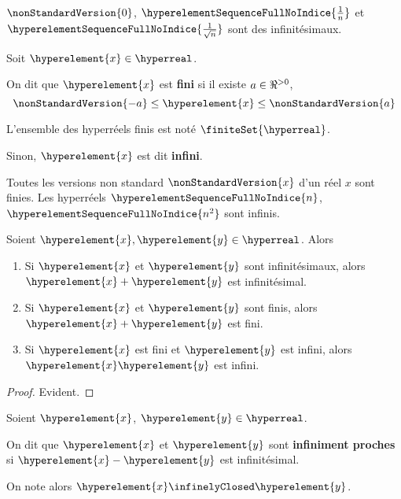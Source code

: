 \begin{exemple}
	$\nonStandardVersion{0}$, $\hyperelementSequenceFullNoIndice{\frac{1}{n}}$ et
	$\hyperelementSequenceFullNoIndice{\frac{1}{\sqrt{n}}}$ sont des infinitésimaux.
\end{exemple}

\begin{definition} 
	Soit $\hyperelement{x} \in \hyperreal$.

	On dit que $\hyperelement{x}$ est \textbf{fini} si il existe $a \in \real^{> 0}$,
	\begin{equation}
		\nonStandardVersion{-a} \leq \hyperelement{x} \leq \nonStandardVersion{a}
	\end{equation}

	L'ensemble des hyperréels finis est noté $\finiteSet{\hyperreal}$.

	Sinon, $\hyperelement{x}$ est dit \textbf{infini}.
\end{definition}

\begin{exemple}
	Toutes les versions non standard $\nonStandardVersion{x}$ d'un réel $x$ sont
	finies. Les hyperréels $\hyperelementSequenceFullNoIndice{n}$,
	$\hyperelementSequenceFullNoIndice{n^{2}}$ sont infinis.
\end{exemple}

\begin{proposition}
	Soient $\hyperelement{x}, \hyperelement{y} \in \hyperreal$. Alors

	\begin{enumerate}
		\item Si $\hyperelement{x}$ et $\hyperelement{y}$ sont infinitésimaux,
			alors $\hyperelement{x} + \hyperelement{y}$ est infinitésimal.
		\item Si $\hyperelement{x}$ et $\hyperelement{y}$ sont finis, alors
			$\hyperelement{x} + \hyperelement{y}$ est fini.
		\item Si $\hyperelement{x}$ est fini et $\hyperelement{y}$ est infini,
			alors $\hyperelement{x} \hyperelement{y}$ est infini.
	\end{enumerate}
\end{proposition}

\ifdefined\outputproof
\begin{proof}
	Evident.
\end{proof}
\fi

\begin{definition} 
	Soient $\hyperelement{x}$, $\hyperelement{y} \in \hyperreal$.

	On dit que $\hyperelement{x}$ et $\hyperelement{y}$ sont \textbf{infiniment
	proches} si $\hyperelement{x} - \hyperelement{y}$ est infinitésimal.

	On note alors $\hyperelement{x} \infinelyClosed \hyperelement{y}$.
\end{definition}


